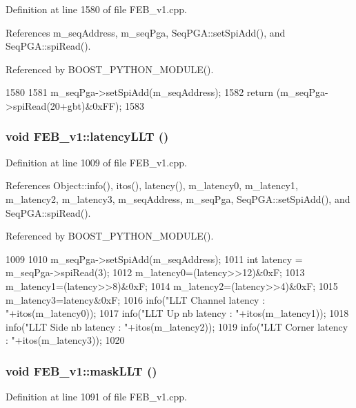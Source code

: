 Definition at line 1580 of file FEB\_\-v1.cpp.

References m\_\-seqAddress, m\_\-seqPga, SeqPGA::setSpiAdd(), and SeqPGA::spiRead().

Referenced by BOOST\_\-PYTHON\_\-MODULE().


\begin{DoxyCode}
1580                                 {
1581   m_seqPga->setSpiAdd(m_seqAddress);
1582   return (m_seqPga->spiRead(20+gbt)&0xFF);
1583 }
\end{DoxyCode}
\hypertarget{classFEB__v1_a42cc3f61fd94d4de68eb605b04fb1e74}{
\subsubsection[{latencyLLT}]{\setlength{\rightskip}{0pt plus 5cm}void FEB\_\-v1::latencyLLT ()}}
\label{classFEB__v1_a42cc3f61fd94d4de68eb605b04fb1e74}


Definition at line 1009 of file FEB\_\-v1.cpp.

References Object::info(), itos(), latency(), m\_\-latency0, m\_\-latency1, m\_\-latency2, m\_\-latency3, m\_\-seqAddress, m\_\-seqPga, SeqPGA::setSpiAdd(), and SeqPGA::spiRead().

Referenced by BOOST\_\-PYTHON\_\-MODULE().


\begin{DoxyCode}
1009                        {
1010   m_seqPga->setSpiAdd(m_seqAddress);
1011   int latency = m_seqPga->spiRead(3);
1012   m_latency0=(latency>>12)&0xF;
1013   m_latency1=(latency>>8)&0xF;
1014   m_latency2=(latency>>4)&0xF;
1015   m_latency3=latency&0xF;
1016   info("LLT Channel latency : "+itos(m_latency0));
1017   info("LLT Up nb   latency : "+itos(m_latency1));
1018   info("LLT Side nb latency : "+itos(m_latency2));
1019   info("LLT Corner  latency : "+itos(m_latency3));
1020 }
\end{DoxyCode}
\hypertarget{classFEB__v1_a14807bfa77f92bb82428c39abea5df88}{
\subsubsection[{maskLLT}]{\setlength{\rightskip}{0pt plus 5cm}void FEB\_\-v1::maskLLT ()}}
\label{classFEB__v1_a14807bfa77f92bb82428c39abea5df88}


Definition at line 1091 of file FEB\_\-v1.cpp.


